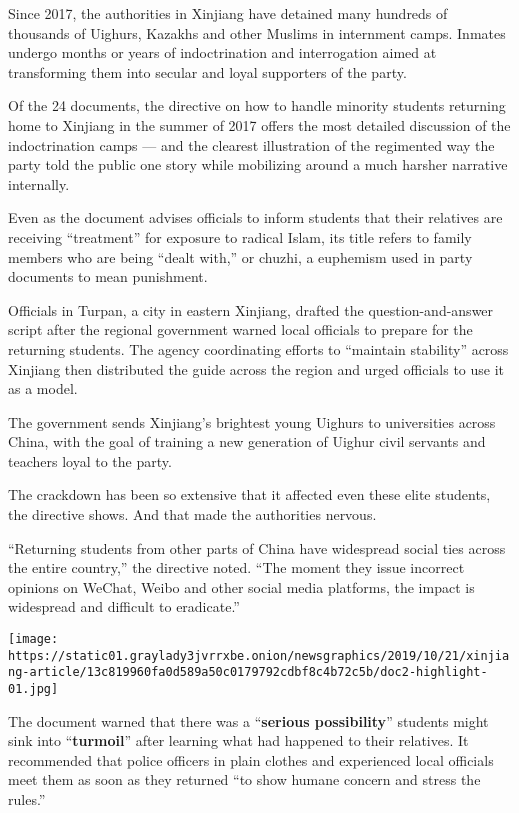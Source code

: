 Since 2017, the authorities in Xinjiang have detained many hundreds of
thousands of Uighurs, Kazakhs and other Muslims in internment camps.
Inmates undergo months or years of indoctrination and interrogation
aimed at transforming them into secular and loyal supporters of the
party.

Of the 24 documents, the directive on how to handle minority students
returning home to Xinjiang in the summer of 2017 offers the most
detailed discussion of the indoctrination camps --- and the clearest
illustration of the regimented way the party told the public one story
while mobilizing around a much harsher narrative internally.

Even as the document advises officials to inform students that their
relatives are receiving ``treatment'' for exposure to radical Islam, its
title refers to family members who are being ``dealt with,'' or chuzhi,
a euphemism used in party documents to mean punishment.

Officials in Turpan, a city in eastern Xinjiang, drafted the
question-and-answer script after the regional government warned local
officials to prepare for the returning students. The agency coordinating
efforts to ``maintain stability'' across Xinjiang then distributed the
guide across the region and urged officials to use it as a model.

The government sends Xinjiang's brightest young Uighurs to universities
across China, with the goal of training a new generation of Uighur civil
servants and teachers loyal to the party.

The crackdown has been so extensive that it affected even these elite
students, the directive shows. And that made the authorities nervous.

``Returning students from other parts of China have widespread social
ties across the entire country,'' the directive noted. ``The moment they
issue incorrect opinions on WeChat, Weibo and other social media
platforms, the impact is widespread and difficult to eradicate.''

\texttt{[image: https://static01.graylady3jvrrxbe.onion/newsgraphics/2019/10/21/xinjiang-article/13c819960fa0d589a50c0179792cdbf8c4b72c5b/doc2-highlight-01.jpg]}

The document warned that there was a ``\textbf{serious possibility}''
students might sink into ``\textbf{turmoil}'' after learning what had
happened to their relatives. It recommended that police officers in
plain clothes and experienced local officials meet them as soon as they
returned ``to show humane concern and stress the rules.''

